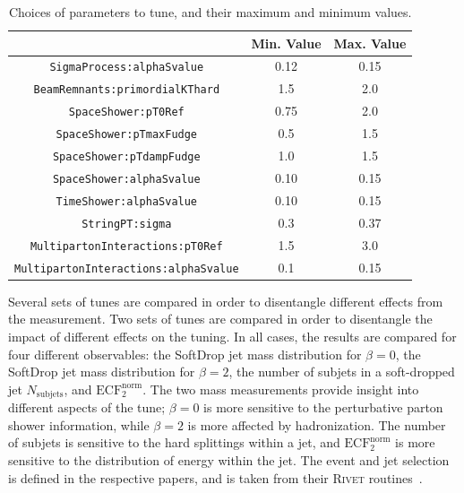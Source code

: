 \begin{table}[ht!]
\caption{Choices of parameters to tune, and their maximum and minimum values.}
\centering\begin{tabular}{ | c | | c | c | } \hline
                                     & Min. Value   & Max. Value    \\ \hline
\texttt{SigmaProcess:alphaSvalue}             &  0.12        & 0.15    \\ \hline
\texttt{BeamRemnants:primordialKThard}        &  1.5         & 2.0     \\ \hline
\texttt{SpaceShower:pT0Ref}                   &  0.75        & 2.0     \\ \hline
\texttt{SpaceShower:pTmaxFudge}               &  0.5         & 1.5     \\ \hline
\texttt{SpaceShower:pTdampFudge}              &  1.0         & 1.5     \\ \hline
\texttt{SpaceShower:alphaSvalue}              &  0.10        & 0.15    \\ \hline
\texttt{TimeShower:alphaSvalue}               &  0.10        & 0.15    \\ \hline
\texttt{StringPT:sigma}                       &  0.3         & 0.37    \\ \hline
\texttt{MultipartonInteractions:pT0Ref}       &  1.5         & 3.0     \\ \hline
\texttt{MultipartonInteractions:alphaSvalue}  &  0.1         & 0.15    \\ \hline
\end{tabular}
\label{tab:parameterSpace}
\end{table}

Several sets of tunes are compared in order to disentangle different effects from the measurement. 
Two sets of tunes are compared in order to disentangle the impact of different effects on the tuning.
In all cases, the results are compared for four different observables:
the SoftDrop jet mass distribution for $\beta=0$, the SoftDrop jet mass distribution for $\beta=2$, 
the number of subjets in a soft-dropped jet $N_{\mathrm{subjets}}$, and $\mathrm{ECF}_2^{\mathrm{norm}}$.
The two mass measurements provide insight into different aspects of the tune; $\beta=0$ is more sensitive to the perturbative parton shower information, 
while $\beta=2$ is more affected by hadronization. The number of subjets is sensitive to the hard splittings within a jet, and $\mathrm{ECF}_2^{\mathrm{norm}}$ is more sensitive to the 
distribution of energy within the jet. The event and jet selection is defined in the respective papers, and is taken from their \textsc{Rivet} routines~\cite{Buckley:2010ar}.

